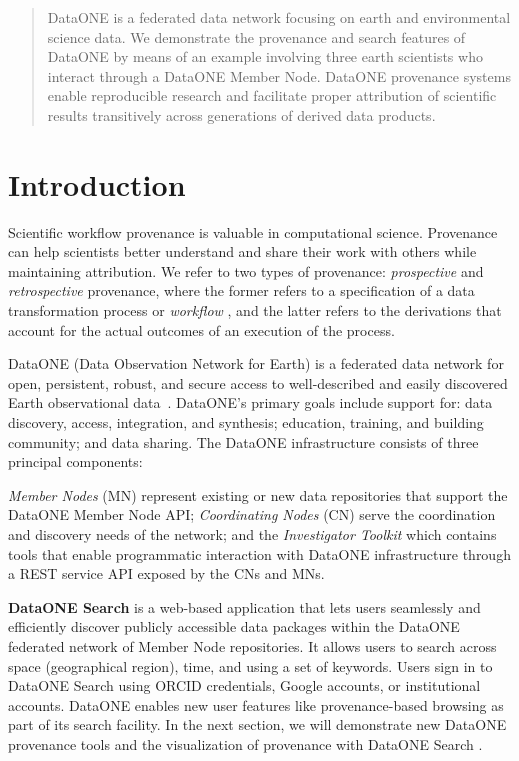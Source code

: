 \documentclass[a4paper]{llncs}
\newcommand{\mypara}[1]{\vspace{4pt}\noindent\textbf{#1}}
\begin{document}
\begin{abstract}
  DataONE is a federated data network focusing on earth and environmental science data. We demonstrate the provenance and search features of DataONE by means of an example involving three earth scientists who interact through a DataONE Member Node. DataONE provenance systems enable reproducible research and facilitate proper attribution of scientific results transitively across generations of derived data products.
 \end{abstract}




\section{Introduction}

Scientific workflow provenance is valuable in computational science. Provenance can help scientists better understand and share their work with others while maintaining attribution. We refer to two types of provenance: \emph{prospective} and \emph{retrospective} provenance, where the former refers to a specification of a data transformation process or \emph{workflow} \cite{Freire2008}, and the latter refers to the derivations that account for the actual outcomes of an execution of the process.

DataONE (Data Observation Network for Earth) is a federated data network for open, persistent, robust, and secure access to well-described and easily discovered Earth observational data~\cite{dataone}. DataONE's primary goals include support for: data discovery, access, integration, and synthesis; education, training, and building community; and data sharing. The DataONE infrastructure consists of three principal components:

\emph{Member Nodes} (MN) represent existing or new data repositories that support the DataONE Member Node API; \emph{Coordinating Nodes} (CN) serve the coordination and discovery needs of the network; and the \emph{Investigator Toolkit} which contains tools that enable programmatic interaction with DataONE infrastructure through a REST service API exposed by the CNs and MNs.


\mypara{DataONE Search} is a web-based application that lets users seamlessly and efficiently discover publicly accessible data packages within the DataONE federated network of Member Node repositories. It allows users to search across space (geographical region), time, and using a set of keywords. Users sign in to DataONE Search using ORCID credentials, Google accounts, or institutional accounts. DataONE enables new user features like provenance-based browsing as part of its search facility. In the next section, we will demonstrate new DataONE provenance tools and the visualization of provenance with DataONE Search \cite{dataone}.
\end{document}
